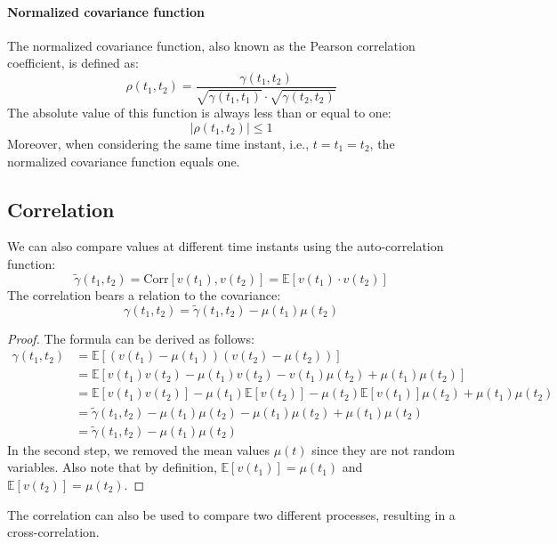 \paragraph*{Normalized covariance function} 
The normalized covariance function, also known as the Pearson correlation coefficient, is defined as:
\[\rho(t_1,t_2)=\dfrac{\gamma(t_1,t_2)}{\sqrt{\gamma(t_1,t_1)} \cdot \sqrt{\gamma(t_2,t_2)}}\]
The absolute value of this function is always less than or equal to one:
\[\left\lvert \rho(t_1,t_2) \right\rvert \leq 1\]
Moreover, when considering the same time instant, i.e., $t = t_1 = t_2$, the normalized covariance function equals one.

\subsection{Correlation}
We can also compare values at different time instants using the auto-correlation function:
\[\tilde{\gamma}(t_1,t_2)=\text{Corr}\left[v(t_1),v(t_2)\right]=\mathbb{E}\left[ v(t_1) \cdot v(t_2) \right]\]
The correlation bears a relation to the covariance:
\[\gamma(t_1,t_2)=\tilde{\gamma}(t_1,t_2) - \mu(t_1)\mu(t_2)\]
\begin{proof}
    The formula can be derived as follows: 
    \begin{align*}
        \gamma(t_1,t_2) &= \mathbb{E}\left[ \left(v(t_1)-\mu(t_1)\right)\left(v(t_2)-\mu(t_2)\right) \right] \\
                        &= \mathbb{E}\left[ v(t_1)v(t_2)-\mu(t_1)v(t_2)-v(t_1)\mu(t_2)+\mu(t_1)\mu(t_2) \right] \\
                        &= \mathbb{E}\left[v(t_1)v(t_2)\right] -\mu(t_1)\mathbb{E}\left[v(t_2)\right]-\mu(t_2)\mathbb{E}\left[v(t_1)\right]\mu(t_2)+\mu(t_1)\mu(t_2) \\
                        &= \tilde{\gamma}(t_1,t_2) - \mu(t_1)\mu(t_2) - \mu(t_1)\mu(t_2) + \mu(t_1)\mu(t_2) \\ 
                        &= \tilde{\gamma}(t_1,t_2) - \mu(t_1)\mu(t_2)
    \end{align*}
    In the second step, we removed the mean values $\mu(t)$ since they are not random variables.
    Also note that by definition, $\mathbb{E}\left[v(t_1)\right] = \mu(t_1)$ and $\mathbb{E}\left[v(t_2)\right] = \mu(t_2)$.
\end{proof}
The correlation can also be used to compare two different processes, resulting in a cross-correlation.